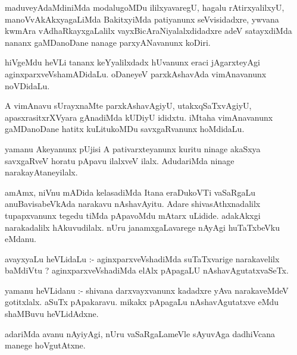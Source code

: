 \documentclass{article}
\begin{document}
\begin{mn}
maduveyAdaMdiniMda  modalugoMDu  ililxyavaregU,  hagalu  rAtirxyalilxyU,  manoVvAkAkxyagaLiMda  BakitxyiMda  
patiyanunx  seVvisidadxre,  ywvana  kwmAra  vAdhaRkayxgaLalilx  vayxBicAraNiyalalxdidadxre  adeV  satayxdiMda  
nananx  gaMDanoDane  nanage  parxyANavanunx  koDiri.
\end{mn}

\begin{mn}
hiVgeMdu  heVLi  tananx  keYyalilxdadx  hUvanunx  eraci  jAgarxteyAgi  aginxparxveVshamADidaLu.  oDaneyeV  
parxkAshavAda  vimAnavanunx  noVDidaLu.
\end{mn}

\begin{mn}
A  vimAnavu  sUrayxnaMte  parxkAshavAgiyU,  utakxqSaTxvAgiyU,  apasxrasitxrXVyara  gAnadiMda  kUDiyU  ididxtu.  
iMtaha  vimAnavanunx  gaMDanoDane  hatitx  kuLitukoMDu  savxgaRvanunx  hoMdidaLu.
\end{mn}

\begin{mn}
yamanu  Akeyanunx  pUjisi  A  pativarxteyanunx  kuritu  ninage  akaSxya  savxgaRveV  horatu  pApavu  ilalxveV  
ilalx.  AdudariMda  ninage  narakayAtaneyilalx.
\end{mn}

\begin{mn}
amAmx,  niVnu  mADida  kelasadiMda  Itana  eraDukoVTi vaSaRgaLu  anuBavisabeVkAda  narakavu  nAshavAyitu.  Adare  
shivasAthxnadalilx  tupapxvanunx  tegedu  tiMda  pApavoMdu  mAtarx  uLidide.  adakAkxgi  narakadalilx  hAkuvudilalx.  
nUru  janamxgaLavarege  nAyAgi  huTaTxbeVku  eMdanu.
\end{mn}

\begin{mn}
avayxyaLu  heVLidaLu :- aginxparxveVshadiMda  suTaTxvarige  narakavelilx  baMdiVtu ?  aginxparxveVshadiMda  elAlx  
pApagaLU  nAshavAgutatxvaSeTx.
\end{mn}

\begin{mn}
yamanu  heVLidanu :- shivana  darxvayxvanunx  kadadxre  yAva  narakaveMdeV  gotitxlalx.  aSuTx  pApakaravu.  
mikakx  pApagaLu  nAshavAgutatxve  eMdu  shaMBuvu  heVLidAdxne.
\end{mn}

\begin{mn}
adariMda  avanu  nAyiyAgi,  nUru  vaSaRgaLameVle  sAyuvAga  dadhiVcana  manege  hoVgutAtxne.
\end{mn}
\end{document}
